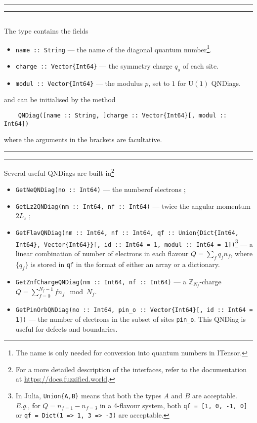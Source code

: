 \documentclass{timesjhep}
\newenvironment{block}[1]{\vspace{0.4\baselineskip}\hrule\vspace{0.10\baselineskip}\hrule\vspace{0.30\baselineskip}{\bfseries #1}\vspace{0.2\baselineskip}\hrule\vspace{0.3\baselineskip}
}{\vspace{0.2\baselineskip}\hrule\vspace{0.10\baselineskip}\hrule\vspace{0.5\baselineskip}}
\begin{document}
\begin{block}{\lstinline|QNDiag| --- Type}
The type contains the fields
\begin{itemize}
    \item \lstinline|name :: String| --- the name of the diagonal quantum number\footnote{The name is only needed for conversion into quantum numbers in ITensor.}.
    \item \lstinline|charge :: Vector{Int64}| --- the symmetry charge $q_o$ of each site.
    \item \lstinline|modul :: Vector{Int64}| --- the modulus $p$, set to $1$ for $\mathrm{U}(1)$ QNDiags. 
\end{itemize}
and can be initialised by the method 
\begin{lstlisting}
    QNDiag([name :: String, ]charge :: Vector{Int64}[, modul :: Int64])
\end{lstlisting}
where the arguments in the brackets are facultative. 
\end{block}

Several useful QNDiags are built-in\footnote{For a more detailed description of the interfaces, refer to the documentation at \url{https://docs.fuzzified.world}.}
\begin{itemize}
    \item \lstinline|GetNeQNDiag(no :: Int64)| --- the numberof electrons ;
    \item \lstinline|GetLz2QNDiag(nm :: Int64, nf :: Int64)| --- twice the angular momentum $2L_z$ ;
    \item \lstinline|GetFlavQNDiag(nm :: Int64, nf :: Int64, qf :: Union{Dict{Int64, Int64}, Vector{Int64}}[, id :: Int64 = 1, modul :: Int64 = 1])|\footnote{In Julia, \lstinline[basicstyle=\ttfamily\scriptsize]|Union{A,B}| means that both the types $A$ and $B$ are acceptable. \textit{E.g.}, for $Q=n_{f=1}-n_{f=3}$ in a 4-flavour system, both \lstinline[basicstyle=\ttfamily\scriptsize]|qf = [1, 0, -1, 0]| or \lstinline[basicstyle=\ttfamily\scriptsize]|qf = Dict(1 => 1, 3 => -3)| are acceptable. } --- a linear combination of number of electrons in each flavour $Q=\sum_fq_fn_f$, where $\{q_f\}$ is stored in \lstinline|qf| in the format of either an array or a dictionary. 
    \item \lstinline|GetZnfChargeQNDiag(nm :: Int64, nf :: Int64)| --- a $\mathbb{Z}_{N_f}$-charge $Q=\sum_{f=0}^{N_f-1}fn_f\mod N_f$.
    \item \lstinline|GetPinOrbQNDiag(no :: Int64, pin_o :: Vector{Int64}[, id :: Int64 = 1])| --- the number of electrons in the subset of sites \lstinline|pin_o|. This QNDiag is useful for defects and boundaries. 
\end{itemize}
\end{document}
